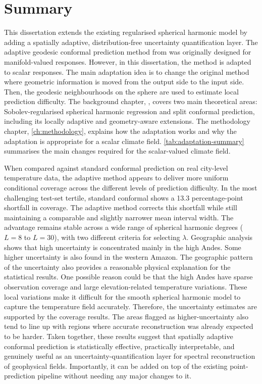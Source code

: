 \documentclass[11pt,a4paper]{report}
\begin{document}
\section{Summary}

This dissertation extends the existing regularised spherical harmonic model by adding a spatially adaptive, distribution-free uncertainty quantification layer. 
The adaptive geodesic conformal prediction method from  \citet{amirishahbazi2026}  was originally designed for manifold-valued responses. However, in this dissertation, the method is adapted to scalar responses. The main adaptation idea is to change the original method where geometric information is moved from the output side to the input side. Then, the geodesic neighbourhoods on the sphere are used to estimate local prediction difficulty. The background chapter, , covers two main theoretical areas: Sobolev-regularised spherical harmonic regression and split conformal prediction, including its locally adaptive and geometry-aware extensions. The methodology chapter, \cref{ch:methodology}, explains how the adaptation works and why the adaptation is appropriate for a scalar climate field. \cref{tab:adaptation-summary} summarises the main changes required for the scalar-valued climate field. 

When compared against standard conformal prediction on real city-level temperature data, the adaptive method appears to deliver more uniform conditional coverage across the different levels of prediction difficulty. In the most challenging test-set tertile, standard conformal shows a 13.3 percentage-point shortfall in coverage. The adaptive method corrects this shortfall while still maintaining a comparable and slightly narrower mean interval width. The advantage remains stable across a wide range of spherical harmonic degrees ($L=8$ to $L=30$), with two different criteria for selecting $\lambda$. Geographic analysis shows that high uncertainty is concentrated mainly in the high Andes. Some higher uncertainty is also found in the western Amazon. The geographic pattern of the uncertainty also provides a reasonable physical explanation for the statistical results. One possible reason could be that the high Andes have sparse observation coverage and large elevation-related temperature variations. These local variations make it difficult for the smooth spherical harmonic model to capture the temperature field accurately. Therefore, the uncertainty estimates are supported by the coverage results. The areas flagged as higher-uncertainty also tend to line up with regions where accurate reconstruction was already expected to be harder. Taken together, these results suggest that spatially adaptive conformal prediction is statistically effective, practically interpretable, and genuinely useful as an uncertainty-quantification layer for spectral reconstruction of geophysical fields. Importantly, it can be added on top of the existing point-prediction pipeline without needing any major changes to it.
 
\end{document}
